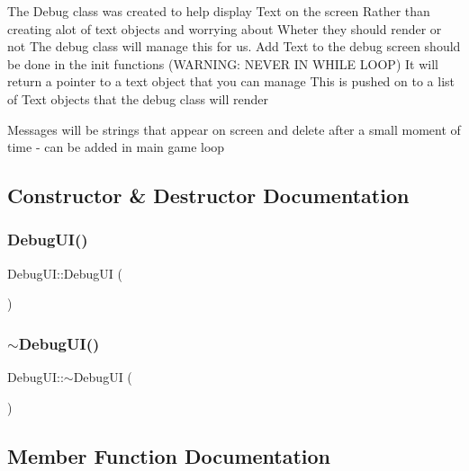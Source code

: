 The Debug class was created to help display Text on the screen Rather than creating alot of text objects and worrying about Wheter they should render or not The debug class will manage this for us. Add Text to the debug screen should be done in the init functions (W\+A\+R\+N\+I\+NG\+: N\+E\+V\+ER IN W\+H\+I\+LE L\+O\+OP) It will return a pointer to a text object that you can manage This is pushed on to a list of Text objects that the debug class will render

Messages will be strings that appear on screen and delete after a small moment of time -\/ can be added in main game loop 

\subsection{Constructor \& Destructor Documentation}
\hypertarget{class_debug_u_i_a4b3d4e2cb69eff1e1dd7c9fa4070601a}{}\label{class_debug_u_i_a4b3d4e2cb69eff1e1dd7c9fa4070601a} 
\subsubsection{\texorpdfstring{Debug\+U\+I()}{DebugUI()}}
{\footnotesize\ttfamily Debug\+U\+I\+::\+Debug\+UI (\begin{DoxyParamCaption}{ }\end{DoxyParamCaption})}

\hypertarget{class_debug_u_i_a9c08c8a56117976e4b3a6873248f1ced}{}\label{class_debug_u_i_a9c08c8a56117976e4b3a6873248f1ced} 
\subsubsection{\texorpdfstring{$\sim$\+Debug\+U\+I()}{~DebugUI()}}
{\footnotesize\ttfamily Debug\+U\+I\+::$\sim$\+Debug\+UI (\begin{DoxyParamCaption}{ }\end{DoxyParamCaption})}



\subsection{Member Function Documentation}
\hypertarget{class_debug_u_i_a8bdf11a44f6308e6ac7a3fb9e9c15cc6}{}\label{class_debug_u_i_a8bdf11a44f6308e6ac7a3fb9e9c15cc6} 
